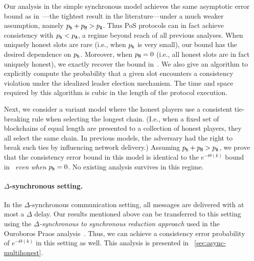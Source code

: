 Our analysis in the simple synchronous model achieves the same
asymptotic error bound as in~\cite{LinearConsistencySODA}---the
tightest result in the literature---under a much weaker assumption,
namely $p_{\mathtt{h}} + p_{\mathtt{H}} > p_{\mathtt{A}}$.  Thus PoS protocols can in fact achieve
consistency with $p_{\mathtt{h}} < p_{\mathtt{A}}$, a regime beyond reach of all previous analyses. 
When uniquely honest slots are rare 
(i.e., when $p_{\mathtt{h}}$ is very small), 
our bound has the desired dependence on $p_{\mathtt{h}}$. 
Moreover, when $p_{\mathtt{H}} = 0$ (i.e., all honest slots are in fact
uniquely honest), we exactly recover the bound
in~\cite{LinearConsistencySODA}. 
We also give an algorithm to explicitly compute the probability 
that a given slot encounters a consistency violation 
under the idealized leader election mechanism. 
The time and space required by this algorithm is cubic 
in the length of the protocol execution.

Next, we consider a variant model where the honest players use a
consistent tie-breaking rule when selecting the longest chain.  (I.e.,
when a fixed set of blockchains of equal length are presented to a
collection of honest players, they all select the same chain.
In previous models, the adversary had the right to break such ties by influencing
network delivery.)
Assuming $p_{\mathtt{h}} + p_{\mathtt{H}} > p_{\mathtt{A}}$, we prove that the consistency error
bound in this model is identical to the $e^{-\Theta(k)}$ bound
in~\cite{LinearConsistencySODA} \emph{even when $p_{\mathtt{h}} =
  0$}. No existing analysis survives in this regime.


\paragraph{$\Delta$-synchronous setting.}
In the $\Delta$-synchronous
communication setting, all messages are delivered with at most
a $\Delta$ delay. Our results mentioned above can be transferred to
this setting using the \emph{$\Delta$-synchronous to synchronous reduction
approach} used in the Ouroboros Praos analysis~\cite{Praos}. Thus, we
can achieve a consistency error probability of $e^{-\Theta(k)}$ in this
setting as well. 
This analysis is presented in 
\Section~\ref{sec:async-multihonest}.

